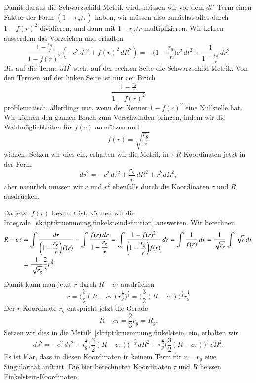 Damit daraus die Schwarzschild-Metrik wird, müssen wir vor dem $dt^2$
Term einen Faktor der Form $(1-r_g/r)$ haben, wir müssen also zunächst
alles durch $1-f(r)^2$ dividieren, und dann mit $1-r_g/r$ multiplizieren.
Wir kehren ausserdem das Vorzeichen und erhalten
\[
\frac{\displaystyle 1-\frac{r_g}{r}}{1-f(r)^2}
(-c^2\,d\tau^2 + f(r)^2\,dR^2)
=
-\biggl(1-\frac{r_g}{r}\biggr)c^2\,dt^2
+\frac{1}{\displaystyle 1-\frac{r_g}{r}}\,dr^2
\]
Bis auf die Terme $d\Omega^2$ steht auf der rechten Seite die
Schwarzschild-Metrik.
Von den Termen auf der linken Seite ist nur der Bruch
\[
\frac{\displaystyle 1-\frac{r_g}{r}}{1-f(r)^2}
\]
problematisch, allerdings nur, wenn der Nenner $1-f(r)^2$ eine
Nullstelle hat.
Wir können den ganzen Bruch zum Verschwinden bringen, indem wir die
Wahlmöglichkeiten für $f(r)$ ausnützen und 
\[
f(r)=\sqrt{\frac{r_g}{r}}
\]
wählen.
Setzen wir dies ein, erhalten wir die Metrik in $\tau$-$R$-Koordinaten
jetzt in der Form
\begin{equation}
ds^2
=
-c^2\,d\tau^2 + \frac{r_g}{r}\,dR^2 + r^2 d\Omega^2,
\label{skript:kruemmung:finkelstein}
\end{equation}
aber natürlich müssen wir $r$ und $r^2$ ebenfalls durch die Koordinaten
$\tau$ und $R$ ausdrücken.

Da jetzt $f(r)$ bekannt ist, können wir die
Integrale~\eqref{skript:kruemmung:finkelsteindefinition} auswerten.
Wir berechnen
\begin{align*}
R-c\tau
&=
\int\frac{dr}{\displaystyle \biggl(1-\frac{r_g}{r}\biggr)f(r)}
- \int\frac{f(r)\,dr}{\displaystyle 1-\frac{r_g}{r}}
=
\int\frac{1-f(r)^2}{\displaystyle\biggl(1-\frac{r_g}{r}\biggr) f(r)}\,dr
=
\int\frac{1}{f(r)}\,dr
=
\frac{1}{\sqrt{\mathstrut r_g}}\int\sqrt{\mathstrut r}\,dr
\\
&=
\frac{1}{\sqrt{\mathstrut r_g}} \frac{2}{3}r^{\frac{3}{2}}
\end{align*}
Damit kann man jetzt $r$ durch $R-c\tau$ ausdrücken
\begin{equation}
r
=
\biggl(\frac{3}{2}(R-c\tau)r_g^{\frac{1}{2}}\biggr)^{\frac23}
=
\biggl(\frac{3}{2}(R-c\tau)\biggr)^{\frac23} r_g^{\frac13}
\label{skript:kruemmung:finkelsteinr}
\end{equation}
Der $r$-Koordinate $r_g$ entspricht jetzt die Gerade
\[
R-c\tau = \frac23 r_g = R_g.
\]
Setzen wir dies in die Metrik~\eqref{skript:kruemmung:finkelstein}
ein, erhalten wir
\[
ds^2
=
-c^2 \,d\tau^2
+r_g^{\frac23}\biggl(\frac32(R-c\tau)\biggr)^{-\frac23}\,dR^2
+ r_g^{\frac23}\biggl(\frac32(R-c\tau)\biggr)^{\frac43}\,d\Omega^2.
\]
Es ist klar, dass in diesen Koordinaten in keinem Term für $r=r_g$
eine Singularität auftritt.
Die hier berechneten Koordinaten $\tau$ und $R$ heissen
Finkelstein-Koordinaten.

